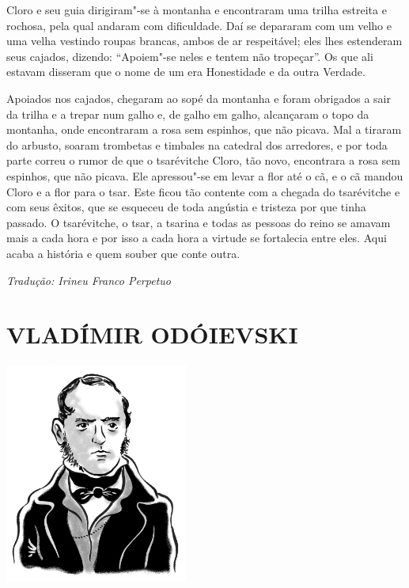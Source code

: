 Cloro e seu guia dirigiram"-se à montanha e encontraram uma trilha
estreita e rochosa, pela qual andaram com dificuldade. Daí se depararam
com um velho e uma velha vestindo roupas brancas, ambos de ar
respeitável; eles lhes estenderam seus cajados, dizendo: ``Apoiem"-se
neles e tentem não tropeçar''. Os que ali estavam disseram que o nome de
um era Honestidade e da outra Verdade.

Apoiados nos cajados, chegaram ao sopé da montanha e foram obrigados a
sair da trilha e a trepar num galho e, de galho em galho, alcançaram o
topo da montanha, onde encontraram a rosa sem espinhos, que não picava.
Mal a tiraram do arbusto, soaram trombetas e timbales na catedral dos
arredores, e por toda parte correu o rumor de que o tsarévitche Cloro,
tão novo, encontrara a rosa sem espinhos, que não picava. Ele apressou"-se
em levar a flor até o cã, e o cã mandou Cloro e a flor para o tsar. Este
ficou tão contente com a chegada do tsarévitche e com seus êxitos, que
se esqueceu de toda angústia e tristeza por que tinha passado. O
tsarévitche, o tsar, a tsarina e todas as pessoas do reino se amavam
mais a cada hora e por isso a cada hora a virtude se fortalecia entre eles. Aqui
acaba a história e quem souber que conte outra.\enlargethispage{\baselineskip}


{\footnotesize\hfill\emph{Tradução: Irineu Franco Perpetuo}}

\part[VLADÍMIR ODÓIEVSKI]{VLADÍMIR ODÓIEVSKI }

\pagebreak
\thispagestyle{empty}
\mbox{}
\vfill
\begin{center}
\includegraphics[width=6cm]{./imgs/autor2.jpg}
\end{center}


